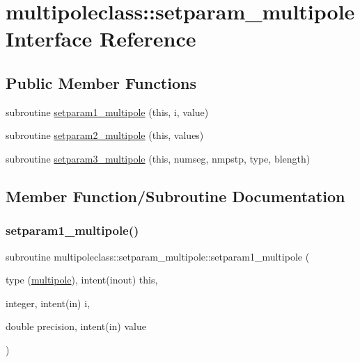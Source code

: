 \hypertarget{interfacemultipoleclass_1_1setparam__multipole}{}\section{multipoleclass\+::setparam\+\_\+multipole Interface Reference}
\label{interfacemultipoleclass_1_1setparam__multipole}
\subsection*{Public Member Functions}
\begin{DoxyCompactItemize}
\item 
subroutine \mbox{\hyperlink{interfacemultipoleclass_1_1setparam__multipole_ac9e471e028b68c2c1e5689a7b0fa6cc2}{setparam1\+\_\+multipole}} (this, i, value)
\item 
subroutine \mbox{\hyperlink{interfacemultipoleclass_1_1setparam__multipole_ab30b441269dcac72360968f590e9cf28}{setparam2\+\_\+multipole}} (this, values)
\item 
subroutine \mbox{\hyperlink{interfacemultipoleclass_1_1setparam__multipole_a621d418b85670ef483f41dc99c72b117}{setparam3\+\_\+multipole}} (this, numseg, nmpstp, type, blength)
\end{DoxyCompactItemize}


\subsection{Member Function/\+Subroutine Documentation}
\mbox{\label{interfacemultipoleclass_1_1setparam__multipole_ac9e471e028b68c2c1e5689a7b0fa6cc2}} 
\subsubsection{\texorpdfstring{setparam1\_multipole()}{setparam1\_multipole()}}
{\footnotesize\ttfamily subroutine multipoleclass\+::setparam\+\_\+multipole\+::setparam1\+\_\+multipole (\begin{DoxyParamCaption}\item[{type (\mbox{\hyperlink{namespacemultipoleclass_structmultipoleclass_1_1multipole}{multipole}}), intent(inout)}]{this,  }\item[{integer, intent(in)}]{i,  }\item[{double precision, intent(in)}]{value }\end{DoxyParamCaption})}

